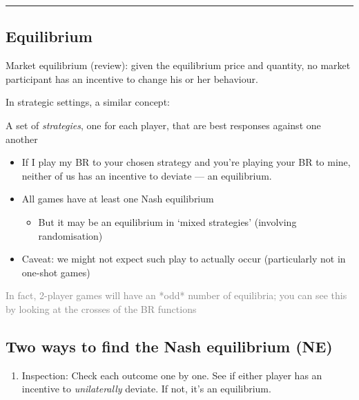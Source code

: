 \documentclass[]{article}
\providecommand{\tightlist}{%
  \setlength{\itemsep}{0pt}\setlength{\parskip}{0pt}}
\begin{document}
\begin{center}\rule{0.5\linewidth}{\linethickness}\end{center}

\hypertarget{equilibrium}{%
\subsection{Equilibrium}\label{equilibrium}}

Market equilibrium (review): given the equilibrium price and quantity, no market participant has an incentive to change his or her behaviour.

\bigskip

In strategic settings, a similar concept:

\begin{description}
\tightlist
\item[Nash equilibrium (NE)]
A set of \emph{strategies}, one for each player, that are best responses against one another
\end{description}

\begin{itemize}
\item
  If I play my BR to your chosen strategy and you're playing your BR to mine, neither of us has an incentive to deviate --- an equilibrium.
\item
  All games have at least one Nash equilibrium

  \begin{itemize}
  \tightlist
  \item
    But it may be an equilibrium in `mixed strategies' (involving randomisation)
  \end{itemize}
\item
  Caveat: we might not expect such play to actually occur (particularly not in one-shot games)
\end{itemize}

\textcolor{gray}{In fact, 2-player games will have an *odd* number of equilibria; you can see this by looking at the crosses of the BR functions}

\hypertarget{two-ways-to-find-the-nash-equilibrium-ne}{%
\subsection{Two ways to find the Nash equilibrium (NE)}\label{two-ways-to-find-the-nash-equilibrium-ne}}

\begin{enumerate}
\def\labelenumi{\arabic{enumi}.}
\tightlist
\item
  Inspection: Check each outcome one by one. See if either player has an incentive to \emph{unilaterally} deviate. If not, it's an equilibrium.
\end{enumerate}
\end{document}

